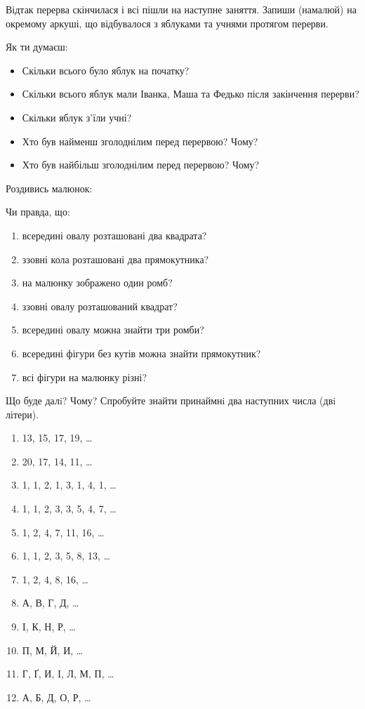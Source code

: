 Відтак перерва скінчилася і всі пішли на наступне заняття.
Запиши (намалюй) на окремому аркуші, що відбувалося з яблуками
та учнями протягом перерви.

Як ти думаєш:
\begin{itemize}
    \item Скільки всього було яблук на початку?
    \item Скільки всього яблук мали Іванка, Маша та Федько
    після закінчення перерви?
    \item Скільки яблук з'їли учні?
    \item Хто був найменш зголоднілим перед перервою? Чому?
    \item Хто був найбільш зголоднілим перед перервою? Чому?
\end{itemize}


\problem
Роздивись малюнок:

Чи правда, що:
\begin{enumerate}
    \item всередині овалу розташовані два квадрата?
    \item ззовні кола розташовані два прямокутника?
    \item на малюнку зображено один ромб?
    \item ззовні овалу розташований квадрат?
    \item всередині овалу можна знайти три ромби?
    \item всередині фігури без кутів можна знайти прямокутник?
    \item всі фігури на малюнку різні?
\end{enumerate}



\problem
Що буде далi? Чому?
Спробуйте знайти принаймнi два наступних числа (двi літери). 
\begin{enumerate}
    \item 13, 15, 17, 19, \ldots
    \item 20, 17, 14, 11, \ldots
    \item 1, 1, 2, 1, 3, 1, 4, 1, \ldots
    \item 1, 1, 2, 3, 3, 5, 4, 7, \ldots
    \item 1, 2, 4, 7, 11, 16, \ldots
    \item 1, 1, 2, 3, 5, 8, 13, \ldots
    \item 1, 2, 4, 8, 16, \ldots
    \item А, В, Г, Д, \ldots
    \item I, К, Н, Р, \ldots
    \item П, М, Й, И, \ldots
    \item Г, Ґ, И, I, Л, М, П, \ldots
    \item А, Б, Д, О, Р, \ldots
\end{enumerate}



